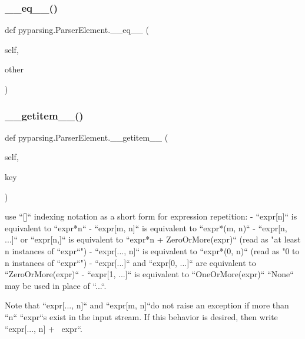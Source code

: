 \subsubsection{\texorpdfstring{\+\_\+\+\_\+eq\+\_\+\+\_\+()}{\_\_eq\_\_()}}
{\footnotesize\ttfamily def pyparsing.\+Parser\+Element.\+\_\+\+\_\+eq\+\_\+\+\_\+ (\begin{DoxyParamCaption}\item[{}]{self,  }\item[{}]{other }\end{DoxyParamCaption})}

\mbox{\label{classpyparsing_1_1ParserElement_a5ec18bd599ba5e749056ebe43e3d7bf3}} 
\subsubsection{\texorpdfstring{\+\_\+\+\_\+getitem\+\_\+\+\_\+()}{\_\_getitem\_\_()}}
{\footnotesize\ttfamily def pyparsing.\+Parser\+Element.\+\_\+\+\_\+getitem\+\_\+\+\_\+ (\begin{DoxyParamCaption}\item[{}]{self,  }\item[{}]{key }\end{DoxyParamCaption})}

\begin{DoxyVerb}use ``[]`` indexing notation as a short form for expression repetition:
 - ``expr[n]`` is equivalent to ``expr*n``
 - ``expr[m, n]`` is equivalent to ``expr*(m, n)``
 - ``expr[n, ...]`` or ``expr[n,]`` is equivalent
      to ``expr*n + ZeroOrMore(expr)``
      (read as "at least n instances of ``expr``")
 - ``expr[..., n]`` is equivalent to ``expr*(0, n)``
      (read as "0 to n instances of ``expr``")
 - ``expr[...]`` and ``expr[0, ...]`` are equivalent to ``ZeroOrMore(expr)``
 - ``expr[1, ...]`` is equivalent to ``OneOrMore(expr)``
 ``None`` may be used in place of ``...``.

Note that ``expr[..., n]`` and ``expr[m, n]``do not raise an exception
if more than ``n`` ``expr``s exist in the input stream.  If this behavior is
desired, then write ``expr[..., n] + ~expr``.\end{DoxyVerb}
 \mbox{\label{classpyparsing_1_1ParserElement_aa43665da30f0da5e64586cad142162e7}} 
